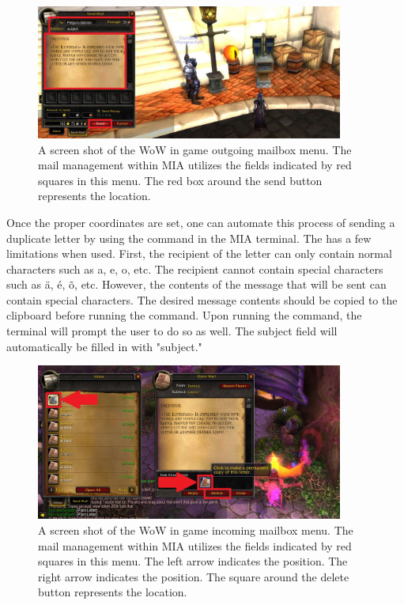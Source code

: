 \begin{figure}[h]
	\centering
	\includegraphics[width=0.9\textwidth]{Images/WoWScrnShot_040518_181350b.jpg}
	\caption{A screen shot of the WoW in game outgoing mailbox menu. The mail management within MIA utilizes the fields indicated by red squares in this menu. The red box around the send button represents the  location.} \label{wow mailbox send}
\end{figure}

Once the proper coordinates are set, one can automate this process of sending a duplicate letter by using the  command in the MIA terminal. The  has a few limitations when used. First, the recipient of the letter can only contain normal characters such as a, e, o, etc. The recipient cannot contain special characters such as \"{a}, \'{e}, \~{o}, etc. However, the contents of the message that will be sent can contain special characters. The desired message contents should be copied to the clipboard before running the  command. Upon running the command, the terminal will prompt the user to do so as well. The subject field will automatically be filled in with "subject."

\begin{figure}[h]
	\centering
	\includegraphics[width=0.9\textwidth]{Images/WoWScrnShot_040518_115947b.jpg}
	\caption{A screen shot of the WoW in game incoming mailbox menu. The mail management within MIA utilizes the fields indicated by red squares in this menu. The left arrow indicates the  position. The right arrow indicates the  position. The square around the delete button represents the  location.} \label{wow mailbox receive}
\end{figure}

